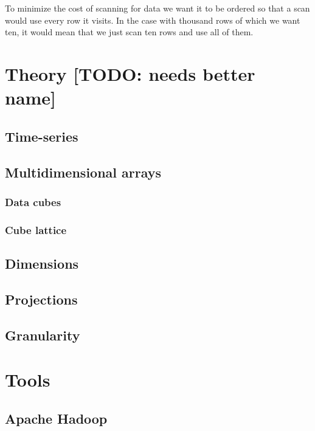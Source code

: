\documentclass[a4paper,10pt]{book}
\begin{document}
To minimize the cost of scanning for data we want it to be ordered so that
a scan would use every row it visits. In the case with thousand rows of
which we want ten, it would mean that we just scan ten rows and use all of
them.



\chapter{Theory [TODO: needs better name]}

\section{Time-series}

\section{Multidimensional arrays}

\subsection{Data cubes}

\subsection{Cube lattice}

\section{Dimensions}

\section{Projections}

\section{Granularity}



\chapter{Tools}

\section{Apache Hadoop}
\end{document}
